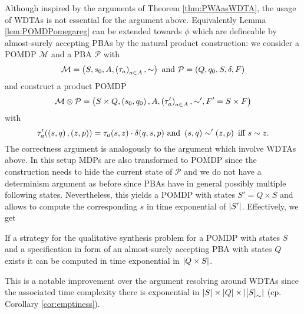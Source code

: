 Although inspired by the arguments of Theorem \ref{thm:PWAasWDTA}, the usage 
of \acp{WDTA} is not essential for the argument above. Equivalently Lemma 
\ref{lem:POMDPomegareg} can be extended towards $\phi$ which
are defineable by almost-surely accepting \acp{PBA} by the natural product 
construction: we consider a \ac{POMDP} $\mathcal{M}$ and a \ac{PBA} 
$\mathcal{P}$ with
\begin{equation*}
  \mathcal{M} = \left(S, s_{0}, A, \left(\tau_{a}\right)_{a\in A}, \sim\right)
  \text{ and }
  \mathcal{P} = \left(Q, q_{0}, S, \delta, F\right)
\end{equation*}
and construct a product \ac{POMDP}
\begin{equation*}
  \mathcal{M}\otimes\mathcal{P} = \left(S\times Q, \left(s_{0}, q_{0}\right), A,
    \left(\tau'_{a}\right)_{a\in A}, \sim', F' = S\times F\right)
\end{equation*}
with
\begin{equation*}
  \tau'_{a}(\left(s, q\right), \left(z, p\right)) = \tau_{a}(s, z)\cdot\delta(q, s, p)
  \text{ and }
  \left(s, q\right)\sim'\left(z, p\right)\text{ iff }s\sim z.
\end{equation*}
The correctness argument is analogously to the argument which involve 
\acp{WDTA} above. In this setup \acp{MDP} are also transformed to \ac{POMDP} 
since the construction needs to hide the current state of $\mathcal{P}$ and we
do not have a determinism argument as before since \acp{PBA} have in general
possibly multiple following states. Nevertheless, this yields a \ac{POMDP} with
states $S' = Q\times S$ and allows to compute the corresponding $s$ in
time exponential of $\left\vert{S'}\right\vert$. Effectively, we get
\begin{corollary}
  If a strategy for the qualitative synthesis problem for a \ac{POMDP} with
  states $S$ and a specification in form of an almost-surely accepting \ac{PBA} 
  with states $Q$ exists it can be computed in time exponential in 
  $\left\vert{Q\times S}\right\vert$.
\end{corollary}
This is a notable improvement over the argument resolving around \acp{WDTA}
since the associated time complexity there is exponential in
$\left\vert{S}\right\vert\times\left\vert{Q}\right\vert\times\left\vert{\left[S\right]_{\sim}}\right\vert$ (cp. Corollary 
\ref{cor:emptiness}).
